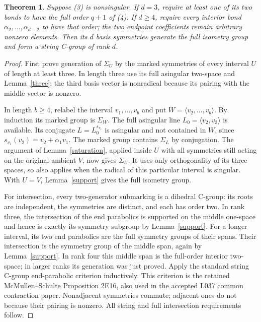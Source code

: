 \documentclass[11pt,a4paper]{article}
\newtheorem{theorem}{Theorem}
\newcommand{\gen}[1]{\langle#1\rangle}
\begin{document}
\begin{theorem}\label{path}
Suppose (3) is nonsingular. If $d=3$, require at least one of its
two bonds to have the full order $q+1$ of (4).
If $d\geq4$, require every interior bond
$\alpha_2,\ldots,\alpha_{d-2}$ to have that order; the two
endpoint coefficients remain arbitrary nonzero elements.
Then its $d$ basis symmetries generate the full isometry group
and form a string C-group of rank $d$.
\end{theorem}
\begin{proof}
First prove generation of $\Sigma_U$ by the marked symmetries
of every interval $U$ of length at least three.
In length three use its full asingular two-space and
Lemma~\ref{three}; the third basis vector is nonradical because
its pairing with the middle vector is nonzero.

In length $b\geq4$, relabel the interval $v_1,\ldots,v_b$
and put $W=\gen{v_2,\ldots,v_b}$. By induction its marked
group is $\Sigma_W$. The full asingular line
$L_0=\gen{v_2,v_3}$ is available. Its conjugate
$L=L_0^{s_{v_1}}$ is asingular and not contained in $W$,
since $s_{v_1}(v_2)=v_2+\alpha_1v_1$.
The marked group contains $\Sigma_L$ by conjugation.
The argument of Lemma~\ref{saturation}, applied inside $U$ with
all symmetries still acting on the original ambient $V$, now gives
$\Sigma_U$. It uses only orthogonality of its three-spaces, so
also applies when the radical of this particular interval is singular.
With $U=V$, Lemma~\ref{support} gives the full isometry group.

For intersection, every two-generator submarking is a dihedral
C-group: its roots are independent, the symmetries are distinct,
and each has order two. In rank three, the intersection of the
end parabolics is supported on the middle one-space and hence is
exactly its symmetry subgroup by Lemma~\ref{support}.
For a longer interval, its two end parabolics are the full symmetry
groups of their spans. Their intersection is the symmetry group of
the middle span, again by Lemma~\ref{support}. In rank four this
middle span is the full-order interior two-space; in larger ranks
its generation was just proved. Apply the standard string C-group
end-parabolic criterion inductively. This criterion is the retained
McMullen--Schulte Proposition 2E16, also used in the accepted
L037 common contraction paper. Nonadjacent symmetries commute;
adjacent ones do not because their pairing is nonzero. All string
and full intersection requirements follow.
\end{proof}
\end{document}
